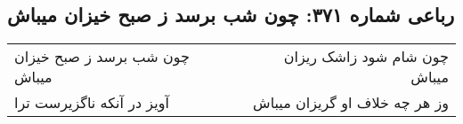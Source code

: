 \begin{center}
\section*{رباعی شماره ۳۷۱: چون شب برسد ز صبح خیزان میباش}
\label{sec:sh371}
\begin{longtable}{l p{0.5cm} r}
چون شب برسد ز صبح خیزان میباش
&&
چون شام شود زاشک ریزان میباش
\\
آویز در آنکه ناگزیرست ترا
&&
وز هر چه خلاف او گریزان میباش
\\
\end{longtable}
\end{center}

